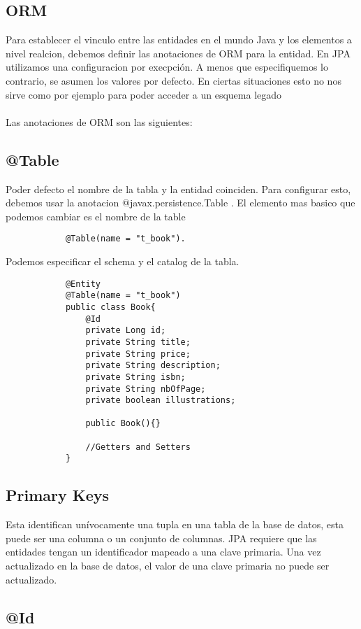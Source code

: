 \documentclass{article}
\begin{document}
\subsection*{ORM}
Para establecer el vinculo entre las entidades en el mundo Java y los elementos a nivel realcion, debemos definir
las anotaciones de ORM para la entidad. En JPA utilizamos una configuracion por execpción. A menos que especifiquemos
lo contrario, se asumen los valores por defecto. En ciertas situaciones esto no nos sirve como por ejemplo para poder
acceder a un esquema legado \\\\
Las anotaciones de ORM son las siguientes:

\subsection*{@Table}
Poder defecto el nombre de la tabla y la entidad coinciden. Para configurar esto, debemos usar la anotacion @javax.persistence.Table .
El elemento mas basico que podemos cambiar es el nombre de la table \begin{lstlisting} 
            @Table(name = "t_book").
        \end{lstlisting}
Podemos especificar el schema y el catalog de la tabla.

\begin{lstlisting}
            @Entity
            @Table(name = "t_book")
            public class Book{
                @Id
                private Long id; 
                private String title;
                private String price; 
                private String description;
                private String isbn;
                private String nbOfPage;
                private boolean illustrations;

                public Book(){}

                //Getters and Setters
            }
         \end{lstlisting}
\subsection*{Primary Keys}
Esta identifican unívocamente una tupla en una tabla de la base de datos, esta puede ser una columna o un conjunto de columnas. JPA requiere que
las entidades tengan un identificador mapeado a una clave primaria. Una vez actualizado en la base de datos, el valor de una clave primaria no puede ser actualizado.

\subsection*{@Id}
\end{document}
